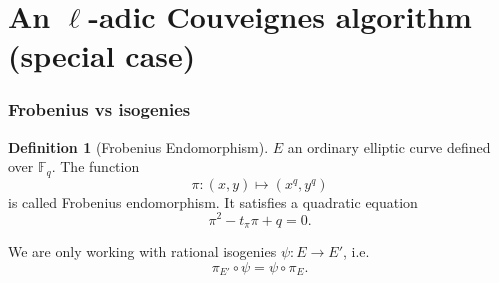 \documentclass[10pt,a4paper]{beamer}
\theoremstyle{plain}
\theoremstyle{definition}
\theoremstyle{definition}
\theoremstyle{definition}
\theoremstyle{definition}
\newtheorem{defi}[thm]{Definition}
\theoremstyle{remark}
\theoremstyle{remark}
\begin{document}
\begin{frame}

\end{frame}

\section{An $\ell$-adic Couveignes algorithm (special case)}


\begin{frame}
\frametitle{Frobenius vs isogenies}
\begin{defi}[Frobenius Endomorphism]
$E$ an ordinary elliptic curve defined over $\mathbb{F}_q$. The function
\[ \pi:(x,y) \mapsto (x^q,y^q)\] is called Frobenius endomorphism. It
satisfies a quadratic equation \[ \pi^2 - t_\pi \pi + q = 0.\]
\end{defi}

We are only working with rational isogenies $\psi:E \to E'$, i.e.
\[
\pi_{E'} \circ \psi =\psi \circ \pi_{E}.
 \]


\end{frame}




\end{document}
